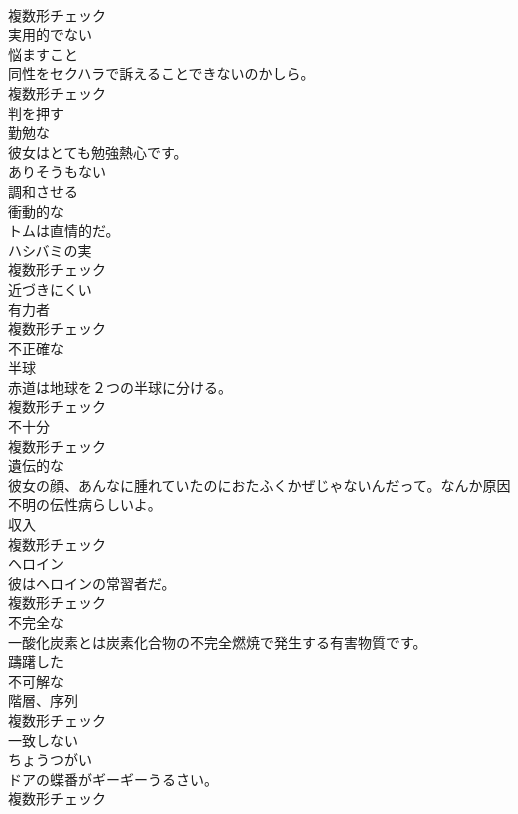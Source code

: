 \documentclass[8pt]{extreport}
\begin{document}
\begin{CJK}{UTF8}{min}
\\	複数形チェック
\\	[形容詞]	実用的でない	
\\	[名詞]	悩ますこと	
\\	同性をセクハラで訴えることできないのかしら。	
\\	複数形チェック
\\	[動詞]	判を押す	
\\	[形容詞]	勤勉な	
\\	彼女はとても勉強熱心です。	
\\	[形容詞]	ありそうもない	
\\	[動詞]	調和させる	
\\	[形容詞]	衝動的な	
\\	トムは直情的だ。	
\\	[名詞]	ハシバミの実	
\\	複数形チェック
\\	[形容詞]	近づきにくい	
\\	[名詞]	有力者	
\\	複数形チェック
\\	[形容詞]	不正確な	
\\	[名詞]	半球	
\\	赤道は地球を２つの半球に分ける。	
\\	複数形チェック
\\	[名詞]	不十分	
\\	複数形チェック
\\	[形容詞]	遺伝的な	
\\	彼女の顔、あんなに腫れていたのにおたふくかぜじゃないんだって。なんか原因不明の伝性病らしいよ。	
\\	[名詞]	収入	
\\	複数形チェック
\\	[名詞]	ヘロイン	
\\	彼はヘロインの常習者だ。	
\\	複数形チェック
\\	[形容詞]	不完全な	
\\	一酸化炭素とは炭素化合物の不完全燃焼で発生する有害物質です。	
\\	[形容詞]	躊躇した	
\\	[形容詞]	不可解な	
\\	[名詞]	階層、序列	
\\	複数形チェック
\\	[形容詞]	一致しない	
\\	[名詞]	ちょうつがい	
\\	ドアの蝶番がギーギーうるさい。	
\\	複数形チェック

\end{CJK}
\end{document}
